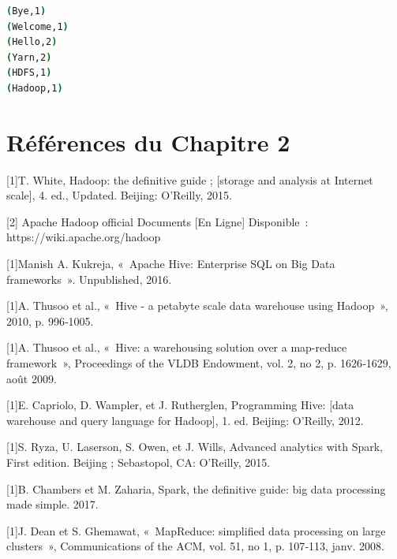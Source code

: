 \documentclass[12pt,french]{book}
\begin{document}
\begin{lstlisting}[language=bash, frame=single]
(Bye,1)
(Welcome,1)
(Hello,2)
(Yarn,2)
(HDFS,1)
(Hadoop,1)
\end{lstlisting}

\section{Références du Chapitre 2}

[1]T. White, Hadoop: the definitive guide ; [storage and analysis at Internet scale], 4. ed., Updated. Beijing: O'Reilly, 2015.

[2] Apache Hadoop official Documents [En Ligne] Disponible : https://wiki.apache.org/hadoop

[1]Manish A. Kukreja, « Apache Hive: Enterprise SQL on Big Data frameworks ». Unpublished, 2016.

[1]A. Thusoo et al., « Hive - a petabyte scale data warehouse using Hadoop », 2010, p. 996‑1005.

[1]A. Thusoo et al., « Hive: a warehousing solution over a map-reduce framework », Proceedings of the VLDB Endowment, vol. 2, no 2, p. 1626‑1629, août 2009.

[1]E. Capriolo, D. Wampler, et J. Rutherglen, Programming Hive: [data warehouse and query language for Hadoop], 1. ed. Beijing: O'Reilly, 2012.

[1]S. Ryza, U. Laserson, S. Owen, et J. Wills, Advanced analytics with Spark, First edition. Beijing ; Sebastopol, CA: O'Reilly, 2015.

[1]B. Chambers et M. Zaharia, Spark,  the definitive guide: big data processing made simple. 2017.

[1]J. Dean et S. Ghemawat, « MapReduce: simplified data processing on large clusters », Communications of the ACM, vol. 51, no 1, p. 107‑113, janv. 2008.
\end{document}
